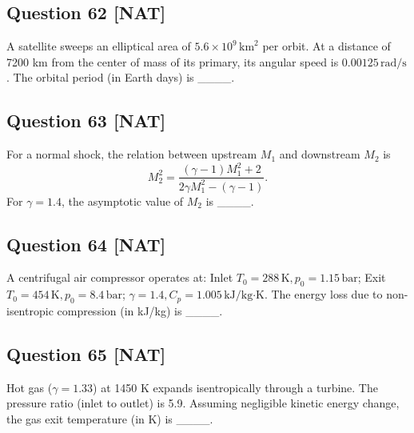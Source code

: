 \documentclass[12pt,a4paper]{article}
\begin{document}
\vspace{0.5cm}

\subsection*{Question 62 [NAT]}
A satellite sweeps an elliptical area of \( 5.6 \times 10^9 \, \text{km}^2 \) per orbit. At a distance of 7200 km from the center of mass of its primary, its angular speed is \( 0.00125 \, \text{rad/s} \). The orbital period (in Earth days) is \_\_\_\_.

\vspace{0.5cm}

\subsection*{Question 63 [NAT]}
For a normal shock, the relation between upstream \( M_1 \) and downstream \( M_2 \) is  
\[
M_2^2 = \frac{(\gamma - 1) M_1^2 + 2}{2\gamma M_1^2 - (\gamma - 1)}.
\]  
For \( \gamma = 1.4 \), the asymptotic value of \( M_2 \) is \_\_\_\_.

\vspace{0.5cm}

\subsection*{Question 64 [NAT]}
A centrifugal air compressor operates at:  
Inlet \( T_0 = 288 \, \text{K}, p_0 = 1.15 \, \text{bar} \);  
Exit \( T_0 = 454 \, \text{K}, p_0 = 8.4 \, \text{bar} \);  
\( \gamma = 1.4, C_p = 1.005 \, \text{kJ/kg·K} \).  
The energy loss due to non-isentropic compression (in kJ/kg) is \_\_\_\_.

\vspace{0.5cm}

\subsection*{Question 65 [NAT]}
Hot gas (\( \gamma = 1.33 \)) at 1450 K expands isentropically through a turbine. The pressure ratio (inlet to outlet) is 5.9. Assuming negligible kinetic energy change, the gas exit temperature (in K) is \_\_\_\_.
\end{document}
